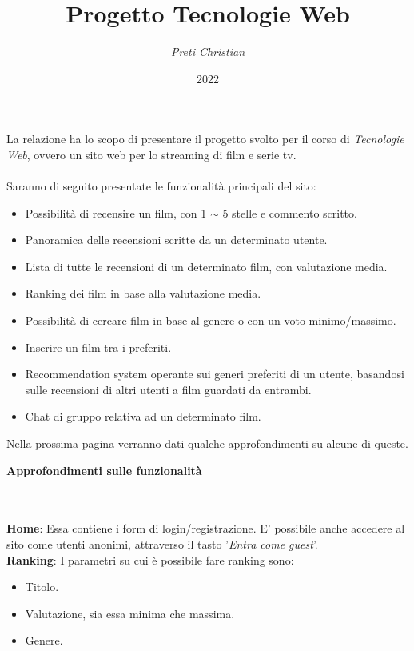 \documentclass[12pt]{article}
\begin{document}
 \noindent
	\title{\Huge \textbf{Progetto Tecnologie Web}}
	\author{\textit{Preti Christian}}
	\date{2022}
	\maketitle 
	\noindent La relazione ha lo scopo di presentare il progetto svolto per il corso di \textit{Tecnologie Web}, ovvero un sito web per lo streaming di film e serie tv. \\ \\
	
	\noindent Saranno di seguito presentate le funzionalità principali del sito: \\
	\begin{itemize}
		\item Possibilità di recensire un film, con 1 $\sim$ 5 stelle e commento scritto.
		\item Panoramica delle recensioni scritte da un determinato utente.
		\item Lista di tutte le recensioni di un determinato film, con valutazione media.
		\item Ranking dei film in base alla valutazione media.
		\item Possibilità di cercare film in base al genere o con un voto minimo/massimo.
		\item Inserire un film tra i preferiti.
		\item Recommendation system operante sui generi preferiti di un utente, basandosi sulle recensioni di altri utenti a film guardati da entrambi.
		\item Chat di gruppo relativa ad un determinato film. \\
	\end{itemize}
	
	\noindent Nella prossima pagina verranno dati qualche approfondimenti su alcune di queste. 
	\pagebreak
	
	
	
	\noindent \centerline {\Huge \textbf{Approfondimenti sulle funzionalità}} \\ \\
	
	\noindent \textbf{Home}: Essa contiene i form di login/registrazione. E' possibile anche accedere al sito come utenti anonimi, attraverso il tasto '\textit{Entra come guest}'. \\
	
	\noindent \textbf{Ranking}: I parametri su cui è possibile fare ranking sono:
	\begin{itemize}
		\item Titolo.
		\item Valutazione, sia essa minima che massima.
		\item Genere. \\
	\end{itemize}
\end{document}
